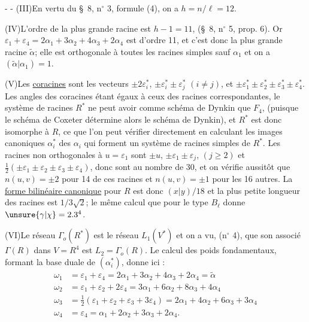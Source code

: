 -  -
(III)\quad En vertu du \S~8, n$^\circ$ 3, formule (4), on a $h=n/\ell=12$.

(IV)\quad L'ordre de la plus grande racine est $h-1=11$, (\S~8, n$^\circ$ 5, prop. 6).
Or $\varepsilon_1+\varepsilon_4=2\alpha_1+3\alpha_2+4\alpha_3+2\alpha_4$ est d'ordre 11, et c'est donc la plus grande
racine $\widetilde{\alpha}$; elle est orthogonale à toutes les racines simples sauf $\alpha_1$ et on a
$(\widetilde{\alpha}|\alpha_1)=1$.

(V)\quad Les \uline{coracines} sont les vecteurs $\pm2\varepsilon_i^*$, $\pm\varepsilon_i^*\pm\varepsilon_j^*$ $(i\ne j)$, et
$\pm\varepsilon_1^*\pm\varepsilon_2^*\pm\varepsilon_3^*\pm\varepsilon_4^*$. Les angles des coracines étant égaux à ceux des racines
correspondantes, le système de racines $R^*$ ne peut avoir comme schéma de Dynkin
que $F_4$, (puisque le schéma de Coxeter détermine alors le schéma de Dynkin), et $R^*$
est donc isomorphe à $R$, ce que l'on peut vérifier directement en calculant les
images canoniques $\alpha_i^*$ des $\alpha_i$ qui forment un système de racines simples de $R^*$. Les
racines non orthogonales à $u=\varepsilon_1$ sont $\pm u$, $\pm\varepsilon_1\pm\varepsilon_j$, $(j\geq2)$ et
$\frac12(\pm\varepsilon_1\pm\varepsilon_2\pm\varepsilon_3\pm\varepsilon_4)$, donc sont au nombre de 30, et on vérifie aussitôt que
$n(u,v)=\pm2$ pour 14 de ces racines et $n(u,v)=\pm1$ pour les 16 autres. La \uline{forme
bilinéaire canonique} pour $R$ est donc $(x|y)/18$ et la plus petite longueur des
racines est $1/3\sqrt2$; le même calcul que pour le type $B_\ell$ donne $\unsure{\gamma|\chi}=2.3^4$.

(VI)\quad Le réseau $\Gamma_o(R^*)$ est le réseau $L_1(V^*)$ et on a vu, (n$^\circ$ 4), que son
associé $\Gamma(R)$ dans $V=R^4$ est $L_2=\Gamma_o(R)$. Le calcul des poids fondamentaux,
formant la base duale de $(\alpha_i^*)$, donne ici :
\[
\begin{aligned}
\omega_1&=\varepsilon_1+\varepsilon_4=2\alpha_1+3\alpha_2+4\alpha_3+2\alpha_4=\widetilde{\alpha}\\
\omega_2&=\varepsilon_1+\varepsilon_2+2\varepsilon_4=3\alpha_1+6\alpha_2+8\alpha_3+4\alpha_4\\
\omega_3&=\tfrac12(\varepsilon_1+\varepsilon_2+\varepsilon_3+3\varepsilon_4)=2\alpha_1+4\alpha_2+6\alpha_3+3\alpha_4\\
\omega_4&=\varepsilon_4=\alpha_1+2\alpha_2+3\alpha_3+2\alpha_4.
\end{aligned}
\]
